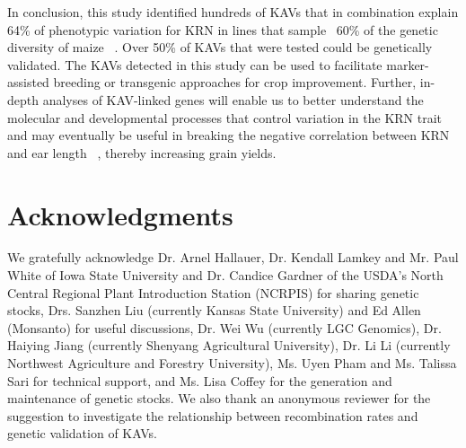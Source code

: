 \documentclass[10pt,letterpaper]{article}
\begin{document}
In conclusion, this study identified hundreds of KAVs that in combination explain 64\% of phenotypic variation for KRN in lines that sample ~60\% of the genetic diversity of maize ~\cite{Liu2003}. Over 50\% of KAVs that were tested could be genetically validated. The KAVs detected in this study can be used to facilitate marker-assisted breeding or transgenic approaches for crop improvement. Further, in-depth analyses of KAV-linked genes will enable us to better understand the molecular and developmental processes that control variation in the KRN trait and may eventually be useful in breaking the negative correlation between KRN and ear length ~\cite{Hallauer2004}, thereby increasing grain yields.





\section*{Acknowledgments}
We gratefully acknowledge Dr. Arnel Hallauer, Dr. Kendall Lamkey and Mr. Paul White of Iowa State University and Dr. Candice Gardner of the USDA’s North Central Regional Plant Introduction Station (NCRPIS) for sharing genetic stocks, Drs. Sanzhen Liu (currently Kansas State University) and Ed Allen (Monsanto) for useful discussions, Dr. Wei Wu (currently LGC Genomics), Dr. Haiying Jiang (currently Shenyang Agricultural University), Dr. Li Li (currently Northwest Agriculture and Forestry University), Ms. Uyen Pham and Ms. Talissa Sari for technical support, and Ms. Lisa Coffey for the generation and maintenance of genetic stocks.  We also thank an anonymous reviewer for the suggestion to investigate the relationship between recombination rates and genetic validation of KAVs.


\nolinenumbers

%
%
% 
\end{document}
